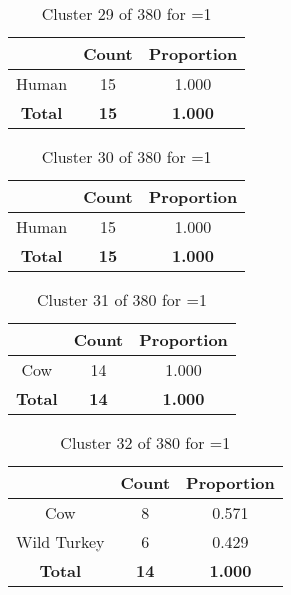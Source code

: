 \begin{table}[ht!]
\centering
\begin{tabular}{|c|c|c|}
\hline
\bf \Spec{} &\bf Count &\bf Proportion\\ \hline \hline
Human & 15 & 1.000\\ \hline
\hline
\bf Total & \bf 15 & \bf 1.000\\ \hline
\end{tabular}
\label{tab:cluster:29:1}
\caption{Cluster 29 of 380 for \minneigh{}=1}
\end{table}

\clearpage
\begin{table}[ht!]
\centering
\begin{tabular}{|c|c|c|}
\hline
\bf \Spec{} &\bf Count &\bf Proportion\\ \hline \hline
Human & 15 & 1.000\\ \hline
\hline
\bf Total & \bf 15 & \bf 1.000\\ \hline
\end{tabular}
\label{tab:cluster:30:1}
\caption{Cluster 30 of 380 for \minneigh{}=1}
\end{table}

\begin{table}[ht!]
\centering
\begin{tabular}{|c|c|c|}
\hline
\bf \Spec{} &\bf Count &\bf Proportion\\ \hline \hline
Cow & 14 & 1.000\\ \hline
\hline
\bf Total & \bf 14 & \bf 1.000\\ \hline
\end{tabular}
\label{tab:cluster:31:1}
\caption{Cluster 31 of 380 for \minneigh{}=1}
\end{table}

\begin{table}[ht!]
\centering
\begin{tabular}{|c|c|c|}
\hline
\bf \Spec{} &\bf Count &\bf Proportion\\ \hline \hline
Cow & 8 & 0.571\\ \hline
Wild Turkey & 6 & 0.429\\ \hline
\hline
\bf Total & \bf 14 & \bf 1.000\\ \hline
\end{tabular}
\label{tab:cluster:32:1}
\caption{Cluster 32 of 380 for \minneigh{}=1}
\end{table}

